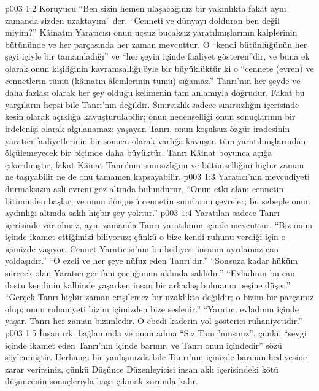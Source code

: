 \vs p003 1:2 Koruyucu “Ben sizin hemen ulaşacağınız bir yakınlıkta fakat aynı zamanda sizden uzaktayım” der. “Cenneti ve dünyayı dolduran ben değil miyim?” Kâinatın Yaratıcısı onun uçsuz bucaksız yaratılmışlarının kalplerinin bütününde ve her parçasında her zaman mevcuttur. O “kendi bütünlüğünün her şeyi içiyle bir tamamladığı” ve “her şeyin içinde faaliyet gösteren”dir, ve buna ek olarak onun kişiliğinin kavramsallığı öyle bir büyüklüktür ki o “cennete (evren) ve cennetlerin tümü (kâinatın âlemlerinin tümü) sığamaz.” Tanrı’nın her şeyde ve daha fazlası olarak her şey olduğu kelimenin tam anlamıyla doğrudur. Fakat bu yargıların hepsi bile Tanrı’nın  değildir. Sınırsızlık sadece sınırsızlığın içerisinde kesin olarak açıklığa kavuşturulabilir; onun nedenselliği onun sonuçlarının bir irdelenişi olarak algılanamaz; yaşayan Tanrı, onun koşulsuz özgür iradesinin yaratıcı faaliyetlerinin bir sonucu olarak varlığa kavuşan tüm yaratılmışlarından ölçülemeyecek bir biçimde daha büyüktür. Tanrı Kâinat boyunca açığa çıkarılmıştır, fakat Kâinat Tanrı’nın sınırsızlığını ve bütünselliğini hiçbir zaman ne taşıyabilir ne de onu tamamen kapsayabilir.
\vs p003 1:3 Yaratıcı’nın mevcudiyeti durmaksızın asli evreni göz altında bulundurur. “Onun etki alanı cennetin bitiminden başlar, ve onun döngüsü cennetin sınırlarını çevreler; bu sebeple onun aydınlığı altında saklı hiçbir şey yoktur.”
\vs p003 1:4 Yaratılan sadece Tanrı içerisinde var olmaz, aynı zamanda Tanrı yaratılanın içinde mevcuttur. “Biz onun içinde ikamet ettiğimizi biliyoruz; çünkü o bize kendi ruhunu verdiği için o içimizde yaşıyor. Cennet Yaratıcısı’nın bu hediyesi insanın ayrılamaz can yoldaşıdır.” “O ezeli ve her şeye nüfuz eden Tanrı’dır.” “Sonsuza kadar hüküm sürecek olan Yaratıcı ger fani çocuğunun aklında saklıdır.” “Evladının bu can dostu kendinin kalbinde yaşarken insan bir arkadaş bulmanın peşine düşer.” “Gerçek Tanrı hiçbir zaman erişilemez bir uzaklıkta değildir; o bizim bir parçamız olup; onun ruhaniyeti bizim içimizden bize seslenir.” “Yaratıcı evladının içinde yaşar. Tanrı her zaman bizimledir. O ebedi kaderin yol gösterici ruhaniyetidir.”
\vs p003 1:5 İnsan ırkı bağlamında ve onun adına “Siz Tanrı’nınsınız”, çünkü “sevgi içinde ikamet eden Tanrı’nın içinde barınır, ve Tanrı onun içindedir” sözü söylenmiştir. Herhangi bir yanlışınızda bile Tanrı’nın içinizde barınan hediyesine zarar verirsiniz, çünkü Düşünce Düzenleyicisi insan aklı içerisindeki kötü düşüncenin sonuçlerıyla başa çıkmak zorunda kalır.
